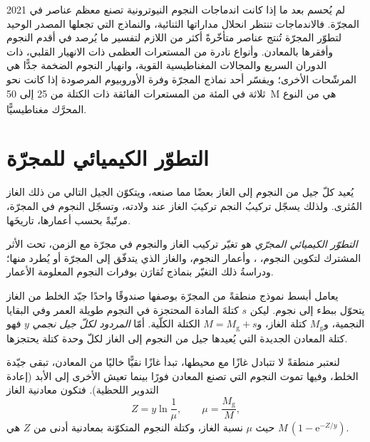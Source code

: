 \begin{dated}{2021}
لم يُحسم بعد ما إذا كانت اندماجات النجوم النيوترونية تصنع معظم عناصر 
في المجرّة. فالاندماجات تنتظر انحلال مداراتها الثنائية،
والنماذج التي تجعلها المصدر الوحيد لتطوّر المجرّة
تُنتج عناصر  متأخّرةً أكثر من اللازم لتفسير ما يُرصد في
أقدم النجوم وأفقرها بالمعادن. وأنواع نادرة من المستعرات العظمى ذات الانهيار القلبي،
ذات الدوران السريع والمجالات المغناطيسية القوية، وانهيار النجوم
الضخمة جدًّا هي المرشّحات الأخرى؛ ويفسّر أحد نماذج المجرّة
وفرة الأوروبيوم المرصودة إذا كانت نحو ثلاثة في المئة من
المستعرات الفائقة ذات الكتلة من 25 إلى \qty{50}{M_\odot} هي من النوع
المحرَّك مغناطيسيًّا.
\end{dated}

\section{التطوّر الكيميائي للمجرّة}\label{sec:b3:origin-of-elements:gce}

يُعيد كلّ جيل من النجوم إلى الغاز بعضًا مما صنعه،
ويتكوّن الجيل التالي من ذلك الغاز المُثرى. ولذلك يسجّل تركيبُ النجم
تركيبَ الغاز عند ولادته، وتسجّل النجوم في المجرّة، مرتّبةً بحسب أعمارها،
تاريخَها.

\begin{definition}\label{def:b3:origin-of-elements:gce}
\emph{التطوّر الكيميائي المجرّي}
هو تغيّر تركيب الغاز والنجوم في مجرّة
مع الزمن، تحت الأثر المشترك لتكوين النجوم،
، وأعمار النجوم، والغاز الذي يتدفّق إلى
المجرّة أو يُطرد منها؛ ودراسةُ ذلك التغيّر بنماذج
تُقارَن بوفرات النجوم المعلومة الأعمار.
\end{definition}

يعامل أبسط نموذج منطقةً من المجرّة بوصفها صندوقًا واحدًا جيّد الخلط من
الغاز يتحوّل ببطء إلى نجوم. ليكن $s$ كتلةَ المادة المحتجزة في
النجوم طويلة العمر وفي البقايا النجمية، و$M_\mathrm{g}$ كتلة الغاز،
و$M = M_\mathrm{g} + s$ الكتلة الكلّية. أمّا \emph{المردود لكلّ جيل
نجمي} $y$ فهو كتلة المعادن الجديدة التي يُعيدها جيل من النجوم
إلى الغاز لكلّ وحدة كتلة يحتجزها.

\begin{theorem}\label{thm:b3:origin-of-elements:closed-box}
لنعتبر منطقةً لا تتبادل غازًا مع محيطها، تبدأ
غازًا نقيًّا خاليًا من المعادن، تبقى جيّدة الخلط، وفيها تموت النجوم
التي تصنع المعادن فورًا بينما تعيش الأخرى إلى الأبد (إعادة
التدوير اللحظية). فتكون معادنية الغاز
\[
Z = y \ln\frac{1}{\mu}, \qquad \mu = \frac{M_\mathrm{g}}{M},
\]
حيث $\mu$ نسبة الغاز، وكتلة النجوم المتكوّنة بمعادنية
أدنى من $Z$ هي \mbox{$M\,(1 - \mathrm{e}^{-Z/y})$}.
\end{theorem}

